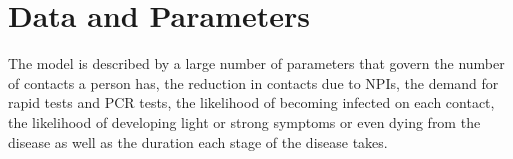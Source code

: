 \section{Data and Parameters}
\label{sec:data_and_parameters}

The model is described by a large number of parameters that govern the number of contacts
a person has, the reduction in contacts due to NPIs, the demand for rapid tests and PCR
tests, the likelihood of becoming infected on each contact, the likelihood of developing
light or strong symptoms or even dying from the disease as well as the duration each
stage of the disease takes.














